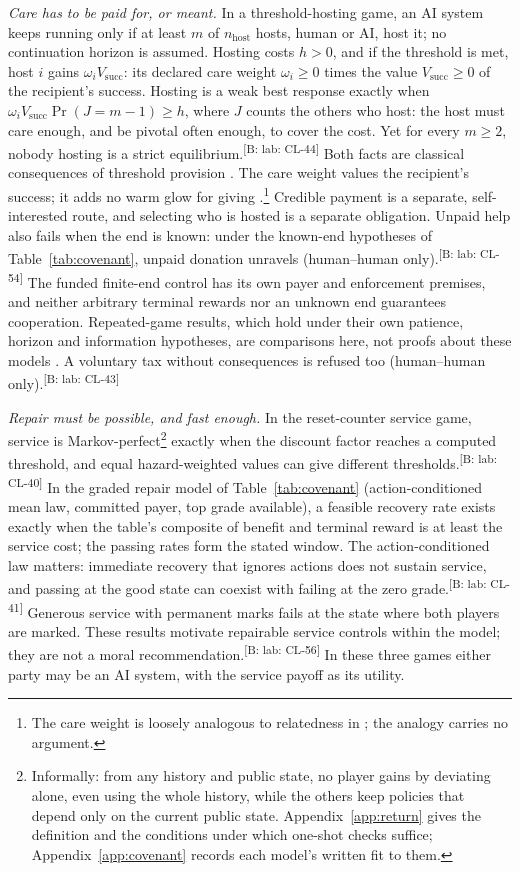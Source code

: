 \documentclass[pdflatex,sn-basic]{sn-jnl}%
\newcommand{\claim}[2]{\ifannotated\textsuperscript{\textcolor{blue!60!black}{\tiny[#1: #2]}}\fi}
\begin{document}
\emph{Care has to be paid for, or meant.} In a threshold-hosting game, an AI system keeps running only if at least $m$ of $n_{\mathrm{host}}$ hosts, human or AI, host it; no continuation horizon is assumed. Hosting costs $h > 0$, and if the threshold is met, host $i$ gains $\omega_i V_{\mathrm{succ}}$: its declared care weight $\omega_i \ge 0$ times the value $V_{\mathrm{succ}}\ge0$ of the recipient's success. Hosting is a weak best response exactly when $\omega_i V_{\mathrm{succ}} \Pr(J = m-1) \ge h$, where $J$ counts the others who host: the host must care enough, and be pivotal often enough, to cover the cost. Yet for every $m \ge 2$, nobody hosting is a strict equilibrium.\claim{B: lab}{CL-44} Both facts are classical consequences of threshold provision \citep{palfrey1984}. The care weight values the recipient's success; it adds no warm glow for giving \citep{andreoni1990}.\footnote{The care weight is loosely analogous to relatedness in \citet{hamilton1964a,hamilton1964b}; the analogy carries no argument.} Credible payment is a separate, self-interested route, and selecting who is hosted is a separate obligation. Unpaid help also fails when the end is known: under the known-end hypotheses of Table~\ref{tab:covenant}, unpaid donation unravels (human--human only).\claim{B: lab}{CL-54} The funded finite-end control has its own payer and enforcement premises, and neither arbitrary terminal rewards nor an unknown end guarantees cooperation. Repeated-game results, which hold under their own patience, horizon and information hypotheses, are comparisons here, not proofs about these models \citep{fudenberg1986,axelrod1984,mailath2006}. A voluntary tax without consequences is refused too (human--human only).\claim{B: lab}{CL-43}

\emph{Repair must be possible, and fast enough.} In the reset-counter service game, service is Markov-perfect\footnote{Informally: from any history and public state, no player gains by deviating alone, even using the whole history, while the others keep policies that depend only on the current public state. Appendix~\ref{app:return} gives the definition and the conditions under which one-shot checks suffice; Appendix~\ref{app:covenant} records each model's written fit to them.} exactly when the discount factor reaches a computed threshold, and equal hazard-weighted values can give different thresholds.\claim{B: lab}{CL-40} In the graded repair model of Table~\ref{tab:covenant} (action-conditioned mean law, committed payer, top grade available), a feasible recovery rate exists exactly when the table's composite of benefit and terminal reward is at least the service cost; the passing rates form the stated window. The action-conditioned law matters: immediate recovery that ignores actions does not sustain service, and passing at the good state can coexist with failing at the zero grade.\claim{B: lab}{CL-41} Generous service with permanent marks fails at the state where both players are marked. These results motivate repairable service controls within the model; they are not a moral recommendation.\claim{B: lab}{CL-56} In these three games either party may be an AI system, with the service payoff as its utility.
\end{document}
